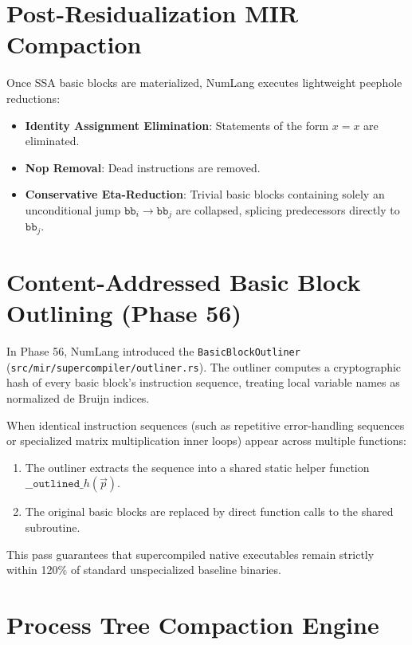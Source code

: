 \section{Post-Residualization MIR Compaction}
\label{sec:compaction:mir_compact}

Once SSA basic blocks are materialized, NumLang executes lightweight peephole reductions:
\begin{itemize}
    \item \textbf{Identity Assignment Elimination}: Statements of the form $x = x$ are eliminated.
    \item \textbf{Nop Removal}: Dead instructions are removed.
    \item \textbf{Conservative Eta-Reduction}: Trivial basic blocks containing solely an unconditional jump $\mathtt{bb}_i \to \mathtt{bb}_j$ are collapsed, splicing predecessors directly to $\mathtt{bb}_j$.
\end{itemize}

\section{Content-Addressed Basic Block Outlining (Phase 56)}
\label{sec:compaction:outliner}

In Phase 56, NumLang introduced the \texttt{BasicBlockOutliner} (\texttt{src/mir/supercompiler/outliner.rs}). The outliner computes a cryptographic hash of every basic block's instruction sequence, treating local variable names as normalized de Bruijn indices.

When identical instruction sequences (such as repetitive error-handling sequences or specialized matrix multiplication inner loops) appear across multiple functions:
\begin{enumerate}
    \item The outliner extracts the sequence into a shared static helper function $\mathtt{\_\_outlined\_}h(\vec{p})$.
    \item The original basic blocks are replaced by direct function calls to the shared subroutine.
\end{enumerate}
This pass guarantees that supercompiled native executables remain strictly within 120\% of standard unspecialized baseline binaries.

\section{Process Tree Compaction Engine}
\label{sec:compaction:compact_impl}

